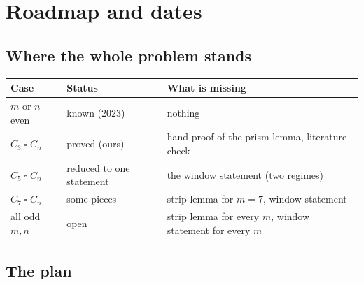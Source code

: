 \documentclass[11pt,oneside,openany]{book}
\newcommand{\T}{\mathbin{\square}}
\begin{document}
\chapter{Roadmap and dates}

\section{Where the whole problem stands}

\begin{center}
\renewcommand{\arraystretch}{1.3}
\begin{tabular}{p{3cm}p{4.2cm}p{6.6cm}}
\toprule
Case & Status & What is missing \\
\midrule
$m$ or $n$ even & \cellcolor{provedc!15}known (2023) & nothing \\
$C_3 \T C_n$ & \cellcolor{provedc!15}proved (ours) & hand proof of the prism lemma, literature check \\
$C_5 \T C_n$ & \cellcolor{partialc!15}reduced to one statement & the window statement (two regimes) \\
$C_7 \T C_n$ & \cellcolor{partialc!15}some pieces & strip lemma for $m=7$, window statement \\
all odd $m, n$ & \cellcolor{openc!12}open & strip lemma for every $m$, window statement for every $m$ \\
\bottomrule
\end{tabular}
\end{center}

\section{The plan}
\end{document}
